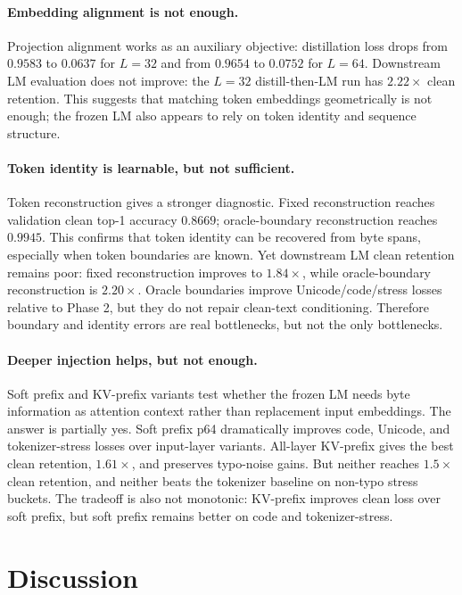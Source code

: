 \documentclass{article}
\begin{document}
\paragraph{Embedding alignment is not enough.}
Projection alignment works as an auxiliary objective: distillation loss drops from $0.9583$ to $0.0637$ for $L=32$ and from $0.9654$ to $0.0752$ for $L=64$. Downstream LM evaluation does not improve: the $L=32$ distill-then-LM run has $2.22\times$ clean retention. This suggests that matching token embeddings geometrically is not enough; the frozen LM also appears to rely on token identity and sequence structure.

\paragraph{Token identity is learnable, but not sufficient.}
Token reconstruction gives a stronger diagnostic. Fixed reconstruction reaches validation clean top-1 accuracy $0.8669$; oracle-boundary reconstruction reaches $0.9945$. This confirms that token identity can be recovered from byte spans, especially when token boundaries are known. Yet downstream LM clean retention remains poor: fixed reconstruction improves to $1.84\times$, while oracle-boundary reconstruction is $2.20\times$. Oracle boundaries improve Unicode/code/stress losses relative to Phase 2, but they do not repair clean-text conditioning. Therefore boundary and identity errors are real bottlenecks, but not the only bottlenecks.

\paragraph{Deeper injection helps, but not enough.}
Soft prefix and KV-prefix variants test whether the frozen LM needs byte information as attention context rather than replacement input embeddings. The answer is partially yes. Soft prefix p64 dramatically improves code, Unicode, and tokenizer-stress losses over input-layer variants. All-layer KV-prefix gives the best clean retention, $1.61\times$, and preserves typo-noise gains. But neither reaches $1.5\times$ clean retention, and neither beats the tokenizer baseline on non-typo stress buckets. The tradeoff is also not monotonic: KV-prefix improves clean loss over soft prefix, but soft prefix remains better on code and tokenizer-stress.

\section{Discussion}
\end{document}
